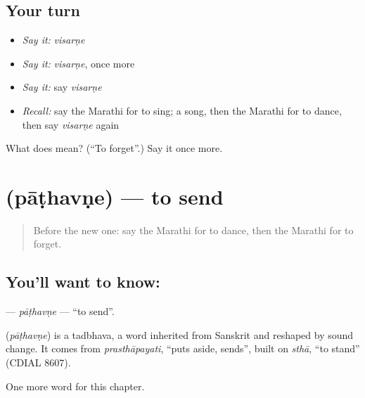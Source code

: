 \subsection*{Your turn}
\begin{itemize}
\raggedright
  \item \emph{Say it:} \emph{visarṇe}
  \item \emph{Say it:} \emph{visarṇe}, once more
  \item \emph{Say it:} say \emph{visarṇe}
  \item \emph{Recall:} say the Marathi for to sing; a song, then the Marathi for to dance, then say \emph{visarṇe} again
\end{itemize}

\begin{tcolorbox}[breakable,colback=teal!4,colframe=teal!35!black,title={Before you move on}]
What does  mean? (\textquotedblleft{}To forget\textquotedblright{}.) Say it once more.
\end{tcolorbox}
\section[\texorpdfstring{\mr{पाठवणे} (pāṭhavṇe)}{पाठवणे (pāṭhavṇe)}]{ (pāṭhavṇe) — to send}

\label{lesson:MR-C80-pathavne}



\begin{quote}
Before the new one: say the Marathi for to dance, then the Marathi for to forget.
\end{quote}

\subsection*{You'll want to know: }
\textbf{} — \emph{pāṭhavṇe} — \textquotedblleft{}to send\textquotedblright{}.

\begin{cousinweb}
\textbf{} (\emph{pāṭhavṇe}) is a tadbhava, a word inherited from Sanskrit and reshaped by sound change. It comes from \emph{prasthāpayati}, \textquotedblleft{}puts aside, sends\textquotedblright{}, built on \emph{sthā}, \textquotedblleft{}to stand\textquotedblright{} (CDIAL 8607).
\end{cousinweb}

\begin{grammarlens}[title={What you've built}]
One more word for this chapter.
\end{grammarlens}

